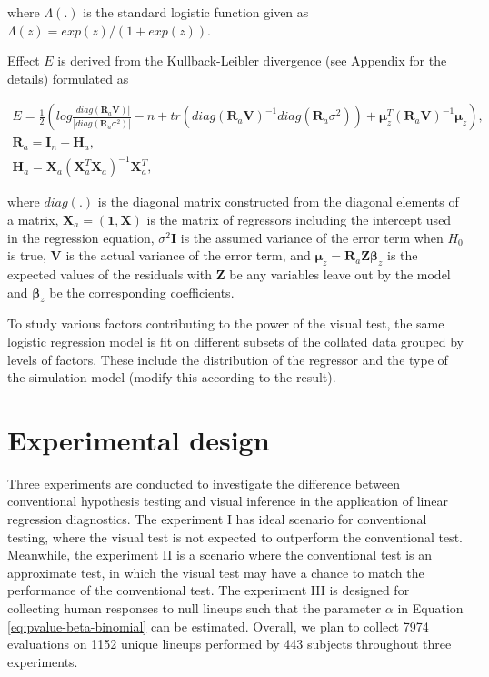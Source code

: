 \documentclass[]{interact}
\theoremstyle{plain}%
\theoremstyle{definition}
\theoremstyle{remark}
\begin{document}
\noindent where \(\Lambda(.)\) is the standard logistic function given
as \(\Lambda(z) = exp(z)/(1+exp(z))\).

Effect \(E\) is derived from the Kullback-Leibler divergence (see
Appendix for the details) formulated as

\small

\begin{gather}  \label{eq:effect-size}
E = \frac{1}{2}\left(log\frac{|diag(\boldsymbol{R}_a\boldsymbol{V})|}{|diag(\boldsymbol{R}_a\sigma^2)|} - n + tr(diag(\boldsymbol{R}_a\boldsymbol{V})^{-1}diag(\boldsymbol{R}_a\sigma^2)) + \boldsymbol{\mu}_z^{T}(\boldsymbol{R}_a\boldsymbol{V})^{-1}\boldsymbol{\mu}_z\right),\\
\boldsymbol{R}_a = \boldsymbol{I}_n - \boldsymbol{H}_a,\\
\boldsymbol{H}_a = \boldsymbol{X}_a(\boldsymbol{X}_a^T\boldsymbol{X}_a)^{-1}\boldsymbol{X}_a^T,
\end{gather}

\normalsize

\noindent where \(diag(.)\) is the diagonal matrix constructed from the
diagonal elements of a matrix,
\(\boldsymbol{X}_a = (\boldsymbol{1}, \boldsymbol{X})\) is the matrix of
regressors including the intercept used in the regression equation,
\(\sigma^2\boldsymbol{I}\) is the assumed variance of the error term
when \(H_0\) is true, \(\boldsymbol{V}\) is the actual variance of the
error term, and
\(\boldsymbol{\mu}_z = \boldsymbol{R}_a\boldsymbol{Z}\boldsymbol{\beta}_z\)
is the expected values of the residuals with \(\boldsymbol{Z}\) be any
variables leave out by the model and \(\boldsymbol{\beta}_z\) be the
corresponding coefficients.

To study various factors contributing to the power of the visual test,
the same logistic regression model is fit on different subsets of the
collated data grouped by levels of factors. These include the
distribution of the regressor and the type of the simulation model
(modify this according to the result).

\hypertarget{experimental-design}{%
\section{Experimental design}\label{experimental-design}}

Three experiments are conducted to investigate the difference between
conventional hypothesis testing and visual inference in the application
of linear regression diagnostics. The experiment I has ideal scenario
for conventional testing, where the visual test is not expected to
outperform the conventional test. Meanwhile, the experiment II is a
scenario where the conventional test is an approximate test, in which
the visual test may have a chance to match the performance of the
conventional test. The experiment III is designed for collecting human
responses to null lineups such that the parameter \(\alpha\) in Equation
\ref{eq:pvalue-beta-binomial} can be estimated. Overall, we plan to
collect 7974 evaluations on 1152 unique lineups performed by 443
subjects throughout three experiments.
\end{document}
